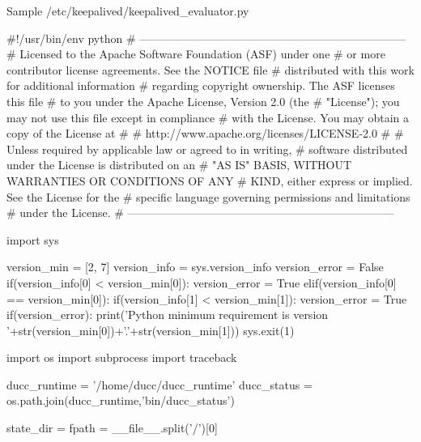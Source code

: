 \begin{minipage}{\textwidth}

	Sample /etc/keepalived/keepalived\_evaluator.py\\
	
	\begin{greybatim}
	
#!/usr/bin/env python
# -----------------------------------------------------------------------
# Licensed to the Apache Software Foundation (ASF) under one
# or more contributor license agreements.  See the NOTICE file
# distributed with this work for additional information
# regarding copyright ownership.  The ASF licenses this file
# to you under the Apache License, Version 2.0 (the
# "License"); you may not use this file except in compliance
# with the License.  You may obtain a copy of the License at
#
#     http://www.apache.org/licenses/LICENSE-2.0
#
# Unless required by applicable law or agreed to in writing,
# software distributed under the License is distributed on an
# "AS IS" BASIS, WITHOUT WARRANTIES OR CONDITIONS OF ANY
# KIND, either express or implied.  See the License for the
# specific language governing permissions and limitations
# under the License.
# -----------------------------------------------------------------------

import sys

version_min = [2, 7]
version_info = sys.version_info
version_error = False
if(version_info[0] < version_min[0]):
    version_error = True
elif(version_info[0] == version_min[0]):
    if(version_info[1] < version_min[1]):
        version_error = True
if(version_error):
    print('Python minimum requirement is version '+str(version_min[0])+'.'+str(version_min[1]))
    sys.exit(1)

import os
import subprocess
import traceback

ducc_runtime = '/home/ducc/ducc_runtime'
ducc_status = os.path.join(ducc_runtime,'bin/ducc_status')

state_dir = fpath = __file__.split('/')[0]

   	\end{greybatim}
   	
\end{minipage}

